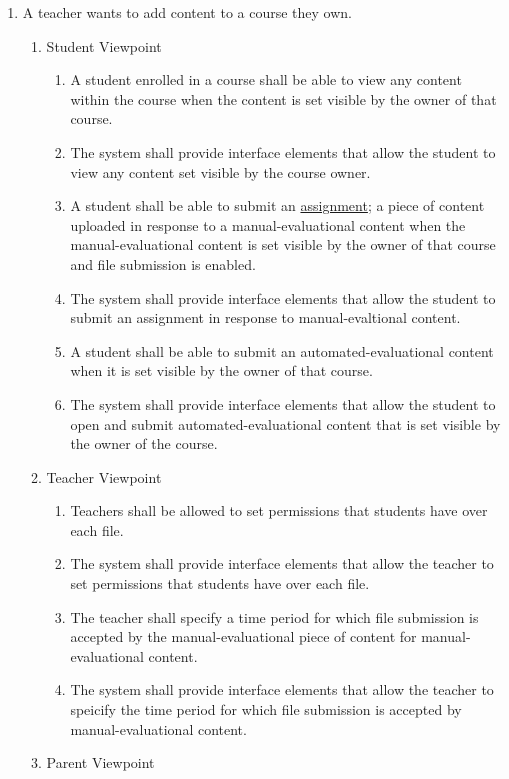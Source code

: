 \documentclass[]{article}
\begin{document}
\begin{enumerate}[{BE}1.]
	\item A teacher wants to add content to a course they own.
	\begin{enumerate}[{VP1}.1]
		\item Student Viewpoint
			\begin{enumerate}
        \item A student enrolled in a course shall be able to view any content within the course when the content is set visible by the owner of that course.
        \item The system shall provide interface elements that allow the student to view any content set visible by the course owner.
        \item A student shall be able to submit an \underline{assignment}; a piece of content uploaded in response to a manual-evaluational content when the manual-evaluational content is set visible by the owner of that course and file submission is enabled.
        \item The system shall provide interface elements that allow the student to submit an assignment in response to manual-evaltional content.
        \item A student shall be able to submit an automated-evaluational content when it is set visible by the owner of that course.
        \item The system shall provide interface elements that allow the student to open and submit automated-evaluational content that is set visible by the owner of the course.
			\end{enumerate}
		\item Teacher Viewpoint
			\begin{enumerate}
				\item Teachers shall be allowed to set permissions that students have over each file.
        \item The system shall provide interface elements that allow the teacher to set permissions that students have over each file.
				\item The teacher shall specify a time period for which file submission is accepted by the manual-evaluational piece of content for manual-evaluational content.
        \item The system shall provide interface elements that allow the teacher to speicify the time period for which file submission is accepted by manual-evaluational content.
			\end{enumerate}
		\item Parent Viewpoint
			\begin{enumerate}

\end{enumerate}
\end{enumerate}
\end{enumerate}
\end{document}
